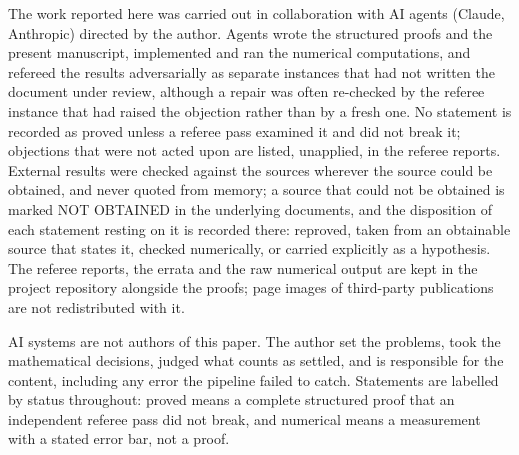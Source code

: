 \documentclass[11pt,a4paper]{article}
\theoremstyle{definition}\newtheorem{definition}[theorem]{Definition}\newtheorem{remark}[theorem]{Remark}\newtheorem{hypothesis}[theorem]{Hypothesis}
\begin{document}
The work reported here was carried out in collaboration with AI agents (Claude, Anthropic)
directed by the author. Agents wrote the structured proofs and the present manuscript,
implemented and ran the numerical computations, and refereed the results adversarially as
separate instances that had not written the document under review, although a repair was
often re-checked by the referee instance that had raised the objection rather than by a fresh
one. No statement is recorded as proved unless a referee pass examined it and did not break
it; objections that were not acted upon are listed, unapplied, in the referee reports.
External results were checked against the sources wherever the source could be obtained, and
never quoted from memory; a source that could not be obtained is marked NOT OBTAINED in the
underlying documents, and the disposition of each statement resting on it is recorded there:
reproved, taken from an obtainable source that states it, checked numerically, or carried
explicitly as a hypothesis. The referee reports, the errata and the raw
numerical output are kept in the project repository alongside the proofs; page images of
third-party publications are not redistributed with it.

AI systems are not authors of this paper. The author set the problems, took the mathematical
decisions, judged what counts as settled, and is responsible for the content, including any
error the pipeline failed to catch. Statements are labelled by status throughout: proved
means a complete structured proof that an independent referee pass did not break, and
numerical means a measurement with a stated error bar, not a proof.
\end{document}
